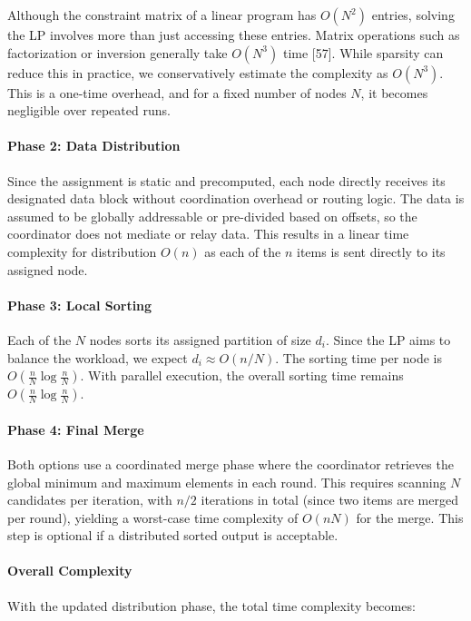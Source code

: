 \documentclass[]{interact}
\theoremstyle{plain}
\theoremstyle{definition}
\theoremstyle{remark}
\begin{document}
Although the constraint matrix of a linear program has \(O(N^2)\) entries, solving the LP involves more than just accessing these entries. Matrix operations such as factorization or inversion generally take \(O(N^3)\) time [57]. While sparsity can reduce this in practice, we conservatively estimate the complexity as $O(N^3)$. This is a one-time overhead, and for a fixed number of nodes $N$, it becomes negligible over repeated runs.

\paragraph{Phase 2: Data Distribution}
Since the assignment is static and precomputed, each node directly receives its designated data block without coordination overhead or routing logic. The data is assumed to be globally addressable or pre-divided based on offsets, so the coordinator does not mediate or relay data. This results in a linear time complexity for distribution $O(n)$ as each of the $n$ items is sent directly to its assigned node.

\paragraph{Phase 3: Local Sorting}
Each of the $N$ nodes sorts its assigned partition of size $d_i$. Since the LP aims to balance the workload, we expect $d_i \approx O(n/N)$. The sorting time per node is $O\left(\frac{n}{N} \log \frac{n}{N}\right)$. With parallel execution, the overall sorting time remains $O\left(\frac{n}{N} \log \frac{n}{N}\right)$.

\paragraph{Phase 4: Final Merge}
Both options use a coordinated merge phase where the coordinator retrieves the global minimum and maximum elements in each round. This requires scanning $N$ candidates per iteration, with $n/2$ iterations in total (since two items are merged per round), yielding a worst-case time complexity of $O(nN)$ for the merge. This step is optional if a distributed sorted output is acceptable.

\paragraph{Overall Complexity}
With the updated distribution phase, the total time complexity becomes:
\end{document}
